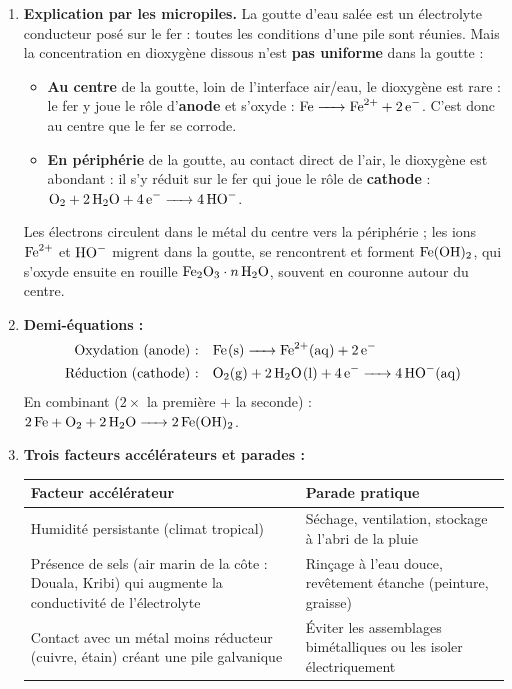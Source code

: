 \documentclass[11pt]{article}
\begin{document}
\begin{corrige}
\begin{enumerate}
\item \textbf{Explication par les micropiles.} La goutte d'eau salée est un électrolyte conducteur posé sur le fer : toutes les conditions d'une pile sont réunies. Mais la concentration en dioxygène dissous n'est \textbf{pas uniforme} dans la goutte :
\begin{itemize}
\item \textbf{Au centre} de la goutte, loin de l'interface air/eau, le dioxygène est rare : le fer y joue le rôle d'\textbf{anode} et s'oxyde : $\ce{Fe -> Fe^2+ + 2e-}$. C'est donc au centre que le fer se corrode.
\item \textbf{En périphérie} de la goutte, au contact direct de l'air, le dioxygène est abondant : il s'y réduit sur le fer qui joue le rôle de \textbf{cathode} : $\ce{O2 + 2H2O + 4e- -> 4HO-}$.
\end{itemize}
Les électrons circulent dans le métal du centre vers la périphérie ; les ions $\ce{Fe^2+}$ et $\ce{HO-}$ migrent dans la goutte, se rencontrent et forment $\ce{Fe(OH)2}$, qui s'oxyde ensuite en rouille $\ce{Fe2O3}\cdot n\,\ce{H2O}$, souvent en couronne autour du centre.
\item \textbf{Demi-équations :}
\begin{align*}
\text{Oxydation (anode) :}\quad & \ce{Fe(s) -> Fe^2+(aq) + 2e-} \\
\text{Réduction (cathode) :}\quad & \ce{O2(g) + 2H2O(l) + 4e- -> 4HO-(aq)}
\end{align*}
En combinant ($2\times$ la première $+$ la seconde) : $\ce{2Fe + O2 + 2H2O -> 2Fe(OH)2}$.
\item \textbf{Trois facteurs accélérateurs et parades :}
\begin{center}
\begin{tabularx}{\linewidth}{|X|X|}
\hline
\rowcolor{popblueL} \textbf{Facteur accélérateur} & \textbf{Parade pratique} \\
\hline
Humidité persistante (climat tropical) & Séchage, ventilation, stockage à l'abri de la pluie \\
\hline
Présence de sels (air marin de la côte : Douala, Kribi) qui augmente la conductivité de l'électrolyte & Rinçage à l'eau douce, revêtement étanche (peinture, graisse) \\
\hline
Contact avec un métal moins réducteur (cuivre, étain) créant une pile galvanique & Éviter les assemblages bimétalliques ou les isoler électriquement \\
\hline
\end{tabularx}
\end{center}
\end{enumerate}
\end{corrige}
\end{document}
